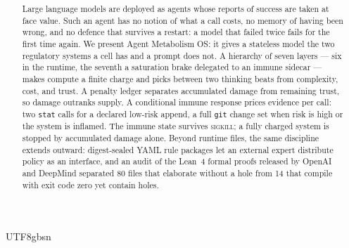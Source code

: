 \documentclass[conference]{IEEEtran}
\title{\titlelineone\\ \titlelinetwo}
\begin{document}
\begin{CJK}{UTF8}{gbsn}
\author{
}

\maketitle
\end{CJK}

\begin{abstract}
Large language models are deployed as agents whose reports of success are taken at
face value. Such an agent has no notion of what a call costs, no memory of having
been wrong, and no defence that survives a restart: a model that failed twice
fails for the first time again. We present Agent Metabolism OS: it gives a
stateless model the two regulatory systems a cell has and a prompt does not. A
hierarchy of seven layers --- six in the runtime, the seventh a saturation brake
delegated to an immune sidecar --- makes compute a finite charge and picks
between two thinking beats from complexity, cost, and trust. A penalty ledger
separates accumulated damage from remaining trust, so damage outranks supply. A
conditional immune response prices evidence per call: two \texttt{stat} calls for
a declared low-risk append, a full \texttt{git} change set when risk is high or
the system is inflamed. The immune state survives \textsc{sigkill}; a fully
charged system is stopped by accumulated damage alone. Beyond runtime files, the
same discipline extends outward: digest-sealed YAML rule packages let an external
expert distribute policy as an interface, and an audit of the Lean~4 formal
proofs released by OpenAI and DeepMind separated 80 files that elaborate without
a hole from 14 that compile with exit code zero yet contain holes.
\end{abstract}
\end{document}
